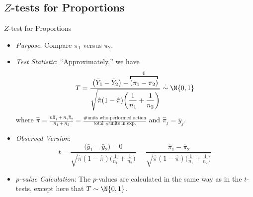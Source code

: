 \subsection{\texorpdfstring{$ Z $}{Z}-tests for Proportions}
\begin{Statistical_Test}{$ Z $-test for Proportions}{}
    \begin{itemize}
        \item \emph{Purpose}: Compare $ \pi_1 $ versus $ \pi_2 $.
        \item \emph{Test Statistic}: ``Approximately,'' we have
              \[ T=\frac{\bigl(\bar{Y}_1-\bar{Y}_2\bigr)-
                      \overbracket{(\pi_1-\pi_2)}^0}{\displaystyle \sqrt{\hat{\pi}(1-\hat{\pi})\biggl(\frac{1}{n_1} +\frac{1}{n_2} \biggr)}}\stackrel{\cdot}{\sim}\N{0,1} \]
              where $ \displaystyle \hat{\pi}=\frac{n\hat{\pi}_1+n_2\hat{\pi}_2}{n_1+n_2}=\frac{\text{\# units who performed action}}{\text{total \# units in exp.}} $
              and $ \hat{\pi}_j=\bar{y}_j $.
        \item \emph{Observed Version}:
              \[ t=\frac{\bigl(\bar{y}_1-\bar{y}_2\bigr)-0}{\displaystyle \sqrt{\hat{\pi}(1-\hat{\pi})\biggl(\frac{1}{n_1} +\frac{1}{n_2} \biggr)}}=
                  \frac{\hat{\pi}_1-\hat{\pi}_2}{\displaystyle \sqrt{\hat{\pi}(1-\hat{\pi})\biggl(\frac{1}{n_1} +\frac{1}{n_2} \biggr)}}\]
        \item \emph{$ p $-value Calculation}: The $ p $-values are calculated
              in the same way as in the $ t $-tests, except here that $ T \sim \N{0,1} $.
    \end{itemize}
\end{Statistical_Test}
